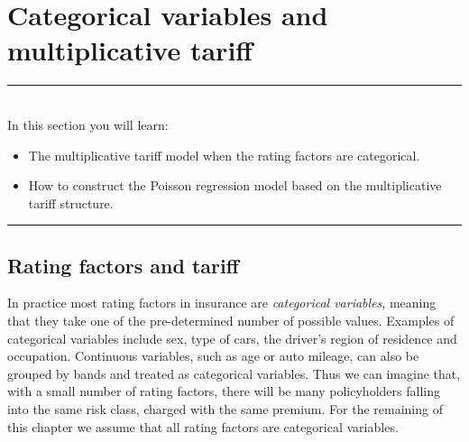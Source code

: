 \documentclass[12pt]{article}
\begin{document}
\section{Categorical variables and multiplicative tariff}
\noindent\rule{12cm}{0.4pt}\\
In this section you will learn:
\begin{itemize}
  \item The multiplicative tariff model when the rating factors are categorical.
  \item How to construct the Poisson regression model based on the multiplicative tariff structure.
\end{itemize}\rule{12cm}{0.4pt}
\subsection{Rating factors and tariff}

In practice most rating factors in insurance are \textit{categorical variables}, meaning that they take one of the pre-determined number of possible values. Examples of categorical variables include sex, type of cars, the driver's region of residence and occupation. Continuous variables, such as age or auto mileage, can also be grouped by bands and treated as categorical variables. Thus we can imagine that, with a small number of rating factors, there will be many policyholders falling into the same risk class,  charged with the same premium. For the remaining of this chapter we assume that all rating factors are categorical variables. \\
\end{document}
